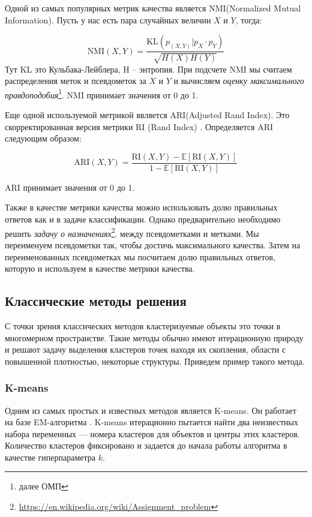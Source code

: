 \documentclass[a4paper,12pt]{extarticle}
\begin{document}
Одной из самых популярных метрик качества является NMI(Normalized Mutual \\
Information).
Пусть у нас есть пара случайных величин $X$ и $Y$, тогда:

\[
	\text{NMI}(X,Y) = \frac{\text{KL}(p_{(X, Y)}| p_X \cdot p_Y)}{\sqrt{H(X)H(Y)}}
\]
Тут KL это Кульбака-Лейблера, H -- энтропия.
При подсчете NMI мы считаем распределения меток и псевдометок 
за $X$ и $Y$ и вычисляем \textit{оценку максимального правдоподобия}\footnote{далее ОМП}. NMI 
принимает значения от 0 до 1.

Еще одной используемой метрикой является ARI(Adjusted Rand Index).
Это скорректированная версия метрики RI (Rand Index) \cite{rand1971objective}.
Определяется ARI следующим образом:

\[
	\text{ARI}(X, Y) = \frac{\text{RI}(X, Y) - \mathds{E}[\text{RI}(X, Y)]}{1 - \mathds{E}[\text{RI}(X, Y)]}
\]

ARI принимает значения от 0 до 1.

Также в качестве метрики качества можно использовать долю 
правильных ответов как и в задаче классификации. Однако предварительно 
необходимо решить \textit{задачу о назначениях}\footnote{\url{https://en.wikipedia.org/wiki/Assignment_problem}}.
между псевдометками и метками.
Мы переименуем псевдометки так, чтобы достичь максимального качества.
Затем на переименованных псевдометках мы посчитаем долю правильных ответов, которую 
и используем в качестве метрики качества.

\subsection{Классические методы решения}

С точки зрения классических методов кластеризуемые
объекты это точки в многомерном пространстве. Такие
методы обычно имеют итерационную природу и решают 
задачу выделения кластеров точек находя их скопления, 
области с повышенной плотностью, некоторые структуры.
Приведем пример такого метода.

\subsubsection{K-means}

Одним из самых простых и известных методов является
K-means. Он работает на базе EM-алгоритма \cite{dempster1977maximum}.
K-means итерационно пытается найти два неизвестных набора переменных ---
номера кластеров для объектов и центры этих кластеров. 
Количество кластеров фиксировано и задается до начала 
работы алгоритма в качестве гиперпараметра $k$.
\end{document}
